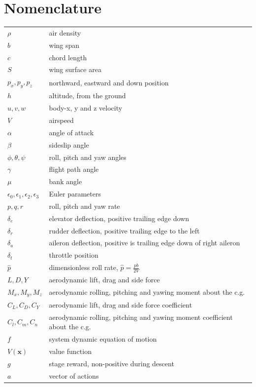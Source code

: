 \documentclass[journal ]{new-aiaa}
\begin{document}
\newpage

\section*{Nomenclature}

\renewcommand{\arraystretch}{0.9}

\noindent\begin{longtable}{@{}l l@{}}
$\rho$ & air density \\
$b$ & wing span \\
$c$ & chord length \\
$S$ & wing surface area \\
$p_x, p_y, p_z$ & northward, eastward and down position \\
$h$ & altitude, from the ground \\
$u, v, w$ & body-x, y and z velocity \\
$V$ & airspeed \\
$\alpha$ & angle of attack \\
$\beta$ & sideslip angle \\
$\phi, \theta, \psi$ & roll, pitch and yaw angles \\
$\gamma$ & flight path angle \\
$\mu$ & bank angle \\
$\epsilon_0, \epsilon_1, \epsilon_2, \epsilon_3$ & Euler parameters \\
$p, q, r$ & roll, pitch and yaw rate \\
$\delta_e$ & elevator deflection, positive trailing edge down \\
$\delta_r$ & rudder deflection, positive trailing edge to the left \\
$\delta_a$ & aileron deflection, positive is trailing edge down of right aileron \\
$\delta_t$ & throttle position \\
$\hat{p}$ & dimensionless roll rate, $\hat{p} = \frac{pb}{2V}$ \\
$L, D, Y$ & aerodynamic lift, drag and side force \\
$M_x, M_y, M_z$ & aerodynamic rolling, pitching and yawing moment about the c.g. \\
$C_L, C_D, C_Y$ & aerodynamic lift, drag and side force coefficient \\
$C_l, C_m, C_n$ & aerodynamic rolling, pitching and yawing moment coefficient about the c.g. \\
$f$ & system dynamic equation of motion \\
$V(\mathbf{x})$ & value function \\
$g$ & stage reward, non-positive during descent \\
$a$ & vector of actions \\
\end{longtable}
\end{document}
